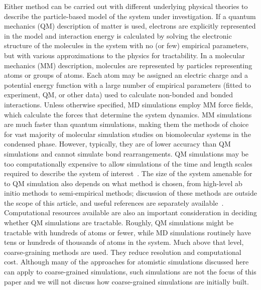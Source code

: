 \documentclass[9pt,bestpractices]{livecoms}
\begin{document}
Either method can be carried out with different underlying physical theories to describe the particle-based model of the system under investigation.
If a quantum mechanics (QM) description of matter is used, electrons are explicitly represented in the model and interaction energy is calculated by solving the electronic structure of the molecules in the system with no (or few) empirical parameters, but with various approximations to the physics for tractability.
In a molecular mechanics (MM) description, molecules are represented by particles representing atoms or groups of atoms. Each atom may be assigned an electric charge and a potential energy function with a large number of empirical parameters (fitted to experiment, QM, or other data) used to calculate non-bonded and bonded interactions. Unless otherwise specified, MD simulations employ MM force fields, which calculate the forces that determine the system dynamics.
MM simulations are much faster than quantum simulations, making them the methods of choice for vast majority of molecular simulation studies on biomolecular systems in the condensed phase.
However, typically, they are of lower accuracy than QM simulations and cannot simulate bond rearrangements.
QM simulations may be too computationally expensive to allow simulations of the time and length scales required to describe the system of interest~\cite{Bottaro2018}.
The size of the system amenable for to QM simulation also depends on what method is chosen, from high-level ab initio methods to semi-empirical methods; discussion of these methods are outside the scope of this article, and useful references are separately available~\cite{Jensen2007}.
Computational resources available are also an important consideration in deciding whether QM simulations are tractable. Roughly, QM simulations might be tractable with hundreds of atoms or fewer, while MD simulations routinely have tens or hundreds of thousands of atoms in the system. Much above that level, coarse-graining methods are used.
They reduce resolution and computational cost. Although many of the approaches for atomistic simulations discussed here can apply to coarse-grained simulations, such simulations are not the focus of this paper and we will not discuss how coarse-grained simulations are initially built.
\end{document}
